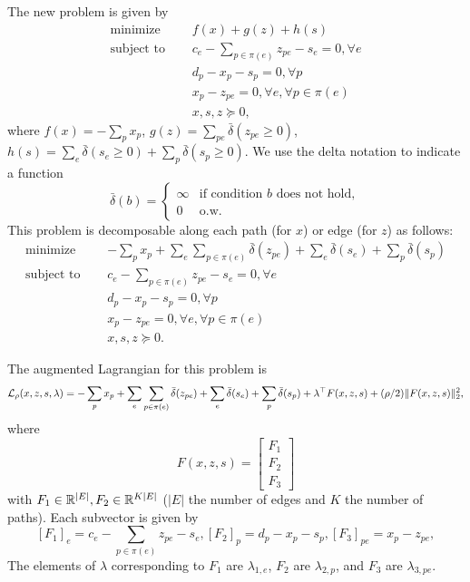 \documentclass[11pt]{article}
\begin{document}
The new problem is given by
\begin{equation}
\label{eqn:network-opt-std}
\begin{aligned}
\textrm{minimize } \quad & f(x) + g(z) + h(s)\\
\textrm{subject to } \quad &c_e - \sum_{p\in\pi(e)}z_{pe} - s_{e} = 0, \forall e\\
& d_p - x_p - s_p = 0, \forall p\\
&x_p - z_{pe} = 0, \forall e, \forall p \in \pi(e)\\
&x,s,z \succeq 0,
\end{aligned}
\end{equation}
where $f(x) = -\sum_p x_p$,
$g(z) = \sum_{pe} \bar\delta(z_{pe} \ge 0)$,
$h(s) = \sum_{e} \bar\delta(s_{e} \ge 0)+ \sum_{p} \bar\delta(s_{p} \ge 0) $.
We use the delta notation to indicate a function
$$
\bar\delta(b) = \begin{cases}
    \infty & \textrm{if condition } b \textrm{ does not hold},\\
    0 & \textrm{o.w.}
\end{cases}
$$
This problem is decomposable along each path (for $x$) or edge (for $z$) as follows:
\begin{equation}
\label{eqn:network-opt-sep}
\begin{aligned}
\textrm{minimize } \quad & -\sum_p x_p
    + \sum_e\sum_{p \in \pi(e)} \bar\delta(z_{pe})
    + \sum_e \bar\delta(s_{e}) + \sum_p \bar\delta(s_p)\\
\textrm{subject to } \quad &c_e - \sum_{p\in\pi(e)}z_{pe} - s_{e} = 0, \forall e\\
& d_p - x_p - s_p = 0, \forall p\\
&x_p - z_{pe} = 0, \forall e, \forall p \in \pi(e)\\
&x,s,z \succeq 0.
\end{aligned}
\end{equation}

The augmented Lagrangian for this problem is
\begin{equation}
    \label{eqn:network-lagrangian}
    \mathcal{L}_\rho(x,z,s,\lambda) =-\sum_p x_p + \sum_e\sum_{p\in\pi(e)} \bar\delta(z_{pe})
        + \sum_{e} \bar\delta(s_{e})
        + \sum_{p} \bar\delta(s_{p})
        + \lambda^\top F(x,z,s)
        + (\rho/2)\| F(x,z,s) \|_2^2,
\end{equation}
where
$$F(x,z,s) =
\begin{bmatrix}
F_1 \\
F_2 \\
F_3
\end{bmatrix}
$$
with $F_1 \in \mathbb{R}^{|E|}, F_2\in\mathbb{R}^{K|E|}$
($|E|$ the number of edges and $K$ the number of paths).
Each subvector is given by
$$
    [F_1]_e = c_e - \sum_{p\in\pi(e)}z_{pe} - s_{e},
    [F_2]_{p} = d_p - x_p - s_p,
    [F_3]_{pe} = x_p - z_{pe},
$$
The elements of $\lambda$ corresponding to $F_1$ are $\lambda_{1,e}$,
$F_2$ are $\lambda_{2,p}$, and $F_3$ are $\lambda_{3,pe}$.
\end{document}
